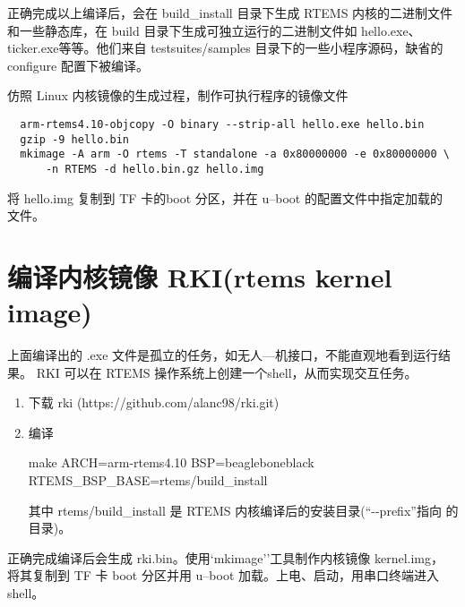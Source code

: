 正确完成以上编译后，会在 build\_install 目录下生成 RTEMS 内核的二进制文件
和一些静态库，在 build 目录下生成可独立运行的二进制文件如 hello.exe、
ticker.exe等等。他们来自 testsuites/samples 目录下的一些小程序源码，缺省的
configure 配置下被编译。

仿照 Linux 内核镜像的生成过程，制作可执行程序的镜像文件

\begin{verbatim}
  arm-rtems4.10-objcopy -O binary --strip-all hello.exe hello.bin
  gzip -9 hello.bin
  mkimage -A arm -O rtems -T standalone -a 0x80000000 -e 0x80000000 \
	  -n RTEMS -d hello.bin.gz hello.img
\end{verbatim}

将 hello.img 复制到 TF 卡的boot 分区，并在 u--boot 的配置文件中指定加载的
文件。

\section{编译内核镜像 RKI(rtems kernel image)}
上面编译出的 .exe 文件是孤立的任务，如无人---机接口，不能直观地看到运行结果。
RKI 可以在 RTEMS 操作系统上创建一个shell，从而实现交互任务。

\begin{enumerate}
  \item 下载 rki (https://github.com/alanc98/rki.git)
  \item 编译

  make ARCH=arm-rtems4.10 BSP=beagleboneblack
    RTEMS\_BSP\_BASE=rtems/build\_install

  其中 rtems/build\_install 是 RTEMS 内核编译后的安装目录(``-{}-prefix''指向
  的目录)。
\end{enumerate}

  正确完成编译后会生成 rki.bin。使用`mkimage''工具制作内核镜像 kernel.img，
将其复制到 TF 卡 boot 分区并用 u--boot 加载。上电、启动，用串口终端进入 shell。

